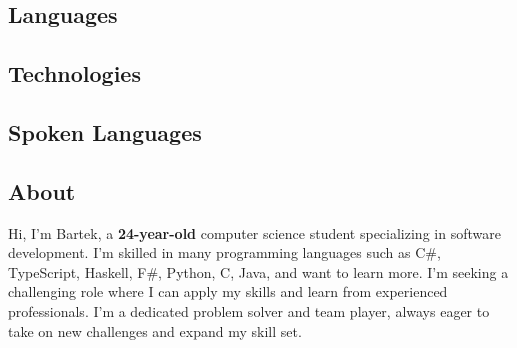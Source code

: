 \vspace*{-1em}
\begin{tcolorbox}
    \vspace*{-0.5em}
    \begin{minipage}[t]{0.28\textwidth} %
        \begin{tcolorbox}[height=0.8\textheight, grow to left by=0.6cm,colback=backdrop,colframe=backdrop,arc=0mm]
            \subsection*{Languages}
            
            \subsection*{Technologies}
            
            \subsection*{Spoken Languages}
        \end{tcolorbox}
    \end{minipage}
    \begin{minipage}[t]{0.7\textwidth} %
        \begin{tcolorbox}[grow to right by=0.75cm,height=0.8\textheight,colframe=white,colback=white]
            
            \section*{About}
            Hi, I'm Bartek, a \textbf{24-year-old} computer science student specializing in software development.
            I'm skilled in many programming languages such as C\#, TypeScript, Haskell, F\#, Python, C, Java, and want to learn more.
            I'm seeking a challenging role where I can apply my skills and learn from experienced professionals.
            I'm a dedicated problem solver and team player, always eager to take on new challenges and expand my skill set.
            

\end{tcolorbox}
\end{minipage}
\end{tcolorbox}
